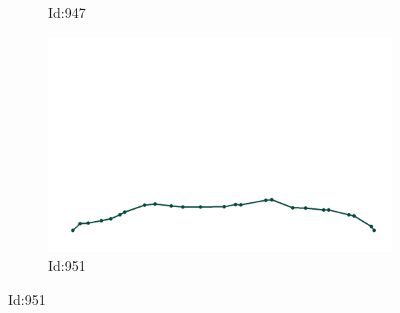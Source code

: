 \documentclass[12pt,twoside]{report}
\begin{document}
\begin{figure}
\begin{subfigure}[b]{0.20\textwidth}
\caption{Id:947}
\end{subfigure}
\begin{subfigure}[b]{0.20\textwidth}
\centering
\includegraphics[width=\textwidth]{../../trajectories/951.png}
\caption{Id:951}
\end{subfigure}
\end{figure}
\end{document}
